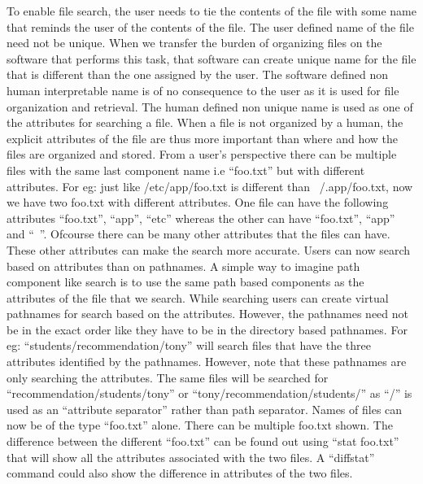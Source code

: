 To enable file search, the user needs to tie the contents of the file with some name that reminds the user of the contents of the file. The user defined name of the file need not be unique. When we transfer the burden of organizing files on the software that performs this task, that software can create unique name for the file that is different than the one assigned by the user. The software defined non human interpretable name is of no consequence to the user as it is used for file organization and retrieval. The human defined non unique name is used as one of the attributes for searching a file. When a file is not organized by a human, the explicit attributes of the file are thus more important than where and how the files are organized and stored. From a user’s perspective there can be multiple files with the same last component name i.e “foo.txt” but with different attributes. For eg: just like /etc/app/foo.txt is different than ~/.app/foo.txt, now we have two foo.txt with different attributes. One file can have the following attributes “foo.txt”, “app”, “etc” whereas the other can have “foo.txt”, “app” and “~”. Ofcourse there can be many other attributes that the files can have. These other attributes can make the search more accurate. Users can now search based on attributes than on pathnames. A simple way to imagine path component like search is to use the same path based components as the attributes of the file that we search.  While searching users can create virtual pathnames for search based on the attributes. However, the pathnames need not be in the exact order like they have to be in the directory based pathnames. For eg: “students/recommendation/tony” will search files that have the three attributes identified by the pathnames. However, note that these pathnames are only searching the attributes. The same files will be searched for “recommendation/students/tony” or “tony/recommendation/students/” as “/” is used as an “attribute separator” rather than path separator. Names of files can now be of the type “foo.txt” alone. There can be multiple foo.txt shown. The difference between the different “foo.txt” can be found out using “stat foo.txt” that will show all the attributes associated with the two files. A “diffstat” command could also show the difference in attributes of the two files.
